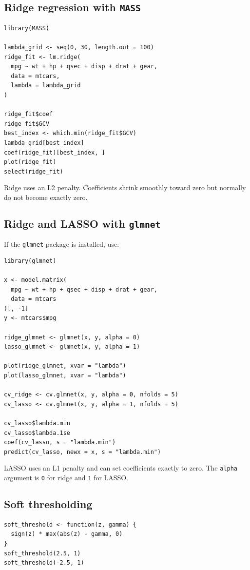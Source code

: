 \documentclass[11pt]{article}
\begin{document}
\subsection{Ridge regression with \texttt{MASS}}
\begin{lstlisting}
library(MASS)

lambda_grid <- seq(0, 30, length.out = 100)
ridge_fit <- lm.ridge(
  mpg ~ wt + hp + qsec + disp + drat + gear,
  data = mtcars,
  lambda = lambda_grid
)

ridge_fit$coef
ridge_fit$GCV
best_index <- which.min(ridge_fit$GCV)
lambda_grid[best_index]
coef(ridge_fit)[best_index, ]
plot(ridge_fit)
select(ridge_fit)
\end{lstlisting}

Ridge uses an L2 penalty. Coefficients shrink smoothly toward zero but
normally do not become exactly zero.

\subsection{Ridge and LASSO with \texttt{glmnet}}
If the \texttt{glmnet} package is installed, use:
\begin{lstlisting}
library(glmnet)

x <- model.matrix(
  mpg ~ wt + hp + qsec + disp + drat + gear,
  data = mtcars
)[, -1]
y <- mtcars$mpg

ridge_glmnet <- glmnet(x, y, alpha = 0)
lasso_glmnet <- glmnet(x, y, alpha = 1)

plot(ridge_glmnet, xvar = "lambda")
plot(lasso_glmnet, xvar = "lambda")

cv_ridge <- cv.glmnet(x, y, alpha = 0, nfolds = 5)
cv_lasso <- cv.glmnet(x, y, alpha = 1, nfolds = 5)

cv_lasso$lambda.min
cv_lasso$lambda.1se
coef(cv_lasso, s = "lambda.min")
predict(cv_lasso, newx = x, s = "lambda.min")
\end{lstlisting}

LASSO uses an L1 penalty and can set coefficients exactly to zero. The
\texttt{alpha} argument is \texttt{0} for ridge and \texttt{1} for LASSO.

\subsection{Soft thresholding}
\begin{lstlisting}
soft_threshold <- function(z, gamma) {
  sign(z) * max(abs(z) - gamma, 0)
}
soft_threshold(2.5, 1)
soft_threshold(-2.5, 1)
\end{lstlisting}
\end{document}

